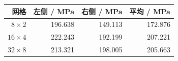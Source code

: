 \begin{tabular}{rrrr}\toprule 网格 & 左侧 / MPa & 右侧 / MPa & 平均 / MPa\\\midrule
$8\times2$ & 196.638 & 149.113 & 172.876\\
$16\times4$ & 222.243 & 192.199 & 207.221\\
$32\times8$ & 213.321 & 198.005 & 205.663\\
\bottomrule\end{tabular}
